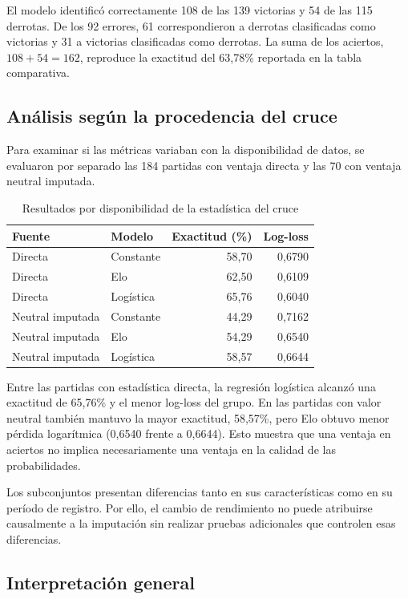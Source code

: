 \documentclass[12pt,a4paper]{article}
\begin{document}
El modelo identificó correctamente 108 de las 139 victorias y 54 de las 115 derrotas. De los 92 errores, 61 correspondieron a derrotas clasificadas como victorias y 31 a victorias clasificadas como derrotas. La suma de los aciertos, $108+54=162$, reproduce la exactitud del 63,78\% reportada en la tabla comparativa.

\subsection{Análisis según la procedencia del cruce}

Para examinar si las métricas variaban con la disponibilidad de datos, se evaluaron por separado las 184 partidas con ventaja directa y las 70 con ventaja neutral imputada.

\begin{table}[htbp]
\centering\small
\caption{Resultados por disponibilidad de la estadística del cruce}
\label{tab:subgrupos}
\begin{tabular}{llrr}
\toprule
\textbf{Fuente} & \textbf{Modelo} & \textbf{Exactitud (\%)} & \textbf{Log-loss}\\
\midrule
Directa & Constante & 58,70 & 0,6790\\
Directa & Elo & 62,50 & 0,6109\\
Directa & Logística & 65,76 & 0,6040\\
\midrule
Neutral imputada & Constante & 44,29 & 0,7162\\
Neutral imputada & Elo & 54,29 & 0,6540\\
Neutral imputada & Logística & 58,57 & 0,6644\\
\bottomrule
\end{tabular}
\end{table}

Entre las partidas con estadística directa, la regresión logística alcanzó una exactitud de 65,76\% y el menor log-loss del grupo. En las partidas con valor neutral también mantuvo la mayor exactitud, 58,57\%, pero Elo obtuvo menor pérdida logarítmica (0,6540 frente a 0,6644). Esto muestra que una ventaja en aciertos no implica necesariamente una ventaja en la calidad de las probabilidades.

Los subconjuntos presentan diferencias tanto en sus características como en su período de registro. Por ello, el cambio de rendimiento no puede atribuirse causalmente a la imputación sin realizar pruebas adicionales que controlen esas diferencias.

\subsection{Interpretación general}
\end{document}
